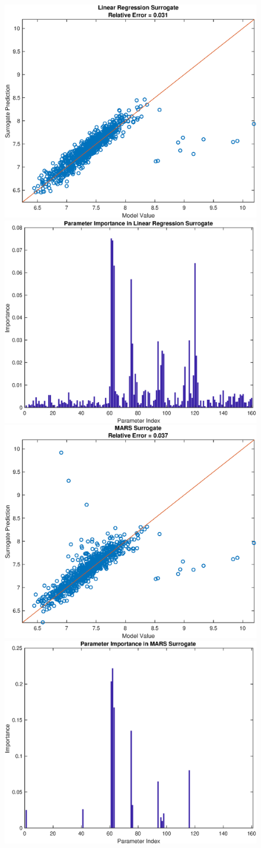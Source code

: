 \documentclass[12pt]{article}
\numberwithin{equation}{section}
\begin{document}
\begin{figure}[h]
\centering
\includegraphics[width=.49 \textwidth]{Figures/K_ECS_Max_QoI_LR_Prediction_Rectangular.eps}
\includegraphics[width=.49 \textwidth]{Figures/K_ECS_Max_QoI_LR_VI_Rectangular.eps}\\
\includegraphics[width=.49 \textwidth]{Figures/K_ECS_Max_QoI_MARS_Prediction_Rectangular.eps}
\includegraphics[width=.49 \textwidth]{Figures/K_ECS_Max_QoI_MARS_VI_Rectangular.eps}
\end{figure}
\end{document}
